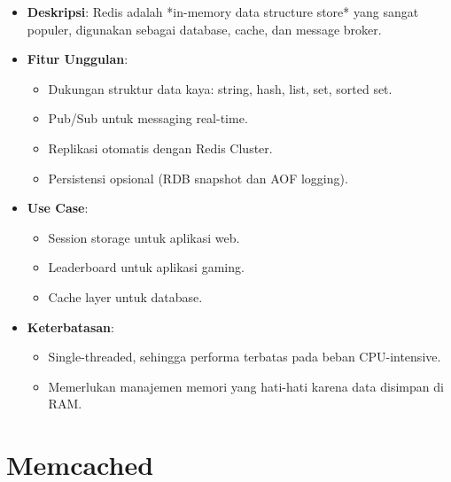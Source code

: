 \documentclass[11pt, a4paper]{book}
\begin{document}
	\begin{itemize}
		\item \textbf{Deskripsi}:  
		Redis adalah *in-memory data structure store* yang sangat populer, digunakan sebagai database, cache, dan message broker.
		
		\item \textbf{Fitur Unggulan}:
		\begin{itemize}
			\item Dukungan struktur data kaya: string, hash, list, set, sorted set.
			\item Pub/Sub untuk messaging real-time.
			\item Replikasi otomatis dengan Redis Cluster.
			\item Persistensi opsional (RDB snapshot dan AOF logging).
		\end{itemize}
		
		\item \textbf{Use Case}:
		\begin{itemize}
			\item Session storage untuk aplikasi web.
			\item Leaderboard untuk aplikasi gaming.
			\item Cache layer untuk database.
		\end{itemize}
		
		\item \textbf{Keterbatasan}:
		\begin{itemize}
			\item Single-threaded, sehingga performa terbatas pada beban CPU-intensive.
			\item Memerlukan manajemen memori yang hati-hati karena data disimpan di RAM.
		\end{itemize}
	\end{itemize}
	
	\section{Memcached}
	\label{sec:memcached}
	
\end{document}
